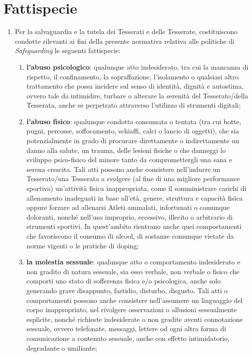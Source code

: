 \documentclass{djtsdoc}
\begin{document}
	\section{Fattispecie}
	\begin{enumerate}
		\item Per la salvaguardia e la tutela dei Tesserati e delle Tesserate, costituiscono condotte rilevanti ai fini della presente normativa relativa alle politiche di \textit{Safeguarding} le seguenti fattispecie:
		\begin{enumerate}
			\item \textbf{l'abuso psicologico}: qualunque atto indesiderato, tra cui la mancanza di rispetto, il	confinamento, la sopraffazione, l'isolamento o qualsiasi altro trattamento che possa incidere	sul senso di identità, dignità e autostima, ovvero tale da intimidire, turbare o alterare la serenità del Tesserato/della Tesserata, anche se perpetrato attraverso l'utilizzo di strumenti digitali;
			\item \textbf{l'abuso fisico}: qualunque condotta consumata o tentata (tra cui botte, pugni, percosse, soffocamento, schiaffi, calci o lancio di oggetti), che sia potenzialmente in grado di procurare 	direttamente o indirettamente un danno alla salute, un trauma, delle lesioni fisiche o che	danneggi lo sviluppo psico-fisico del minore tanto da compromettergli una sana e serena crescita. Tali atti possono anche consistere nell'indurre un Tesserato/una Tesserata a svolgere (al fine di una migliore performance sportiva) un'attività fisica inappropriata, come il somministrare carichi di allenamento inadeguati in base all'età, genere, struttura e capacità fisica oppure forzare ad allenarsi Atleti ammalati, infortunati o comunque doloranti, nonché nell'uso improprio, eccessivo, illecito o arbitrario di strumenti sportivi. In quest'ambito rientrano anche quei comportamenti che favoriscono il consumo di alcool, di sostanze comunque vietate da norme vigenti o le pratiche di doping;
			\item \textbf{la molestia sessuale}: qualunque atto o comportamento indesiderato e non gradito di natura sessuale, sia esso verbale, non verbale o fisico che comporti uno stato di sofferenza fisica e/o psicologica, anche solo generando grave disappunto, fastidio, disturbo, disgusto. Tali atti o	comportamenti possono anche consistere nell'assumere un linguaggio del corpo inappropriato, nel rivolgere osservazioni o allusioni sessualmente esplicite, nonché richieste indesiderate o non gradite aventi connotazione sessuale, ovvero telefonate, messaggi, lettere od ogni altra forma di comunicazione a contenuto sessuale, anche con effetto intimidatorio, degradante o umiliante;

\end{enumerate}
\end{enumerate}
\end{document}

